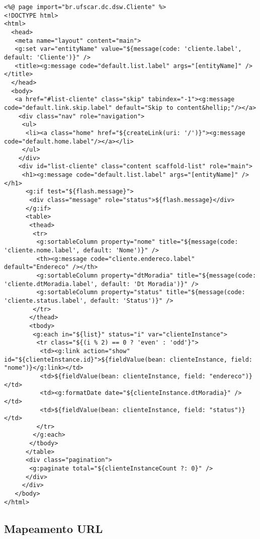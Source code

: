 \begin{lstlisting}[caption=Visão       {\bf       cliente/index.gsp},      frame
    =trBL,float=htbp, label=codCliIndex] 
<%@ page import="br.ufscar.dc.dsw.Cliente" %>
<!DOCTYPE html>
<html>
  <head>
   <meta name="layout" content="main">
   <g:set var="entityName" value="${message(code: 'cliente.label', default: 'Cliente')}" />
   <title><g:message code="default.list.label" args="[entityName]" /></title>
  </head>
  <body>
   <a href="#list-cliente" class="skip" tabindex="-1"><g:message code="default.link.skip.label" default="Skip to content&hellip;"/></a>
    <div class="nav" role="navigation">
     <ul>
      <li><a class="home" href="${createLink(uri: '/')}"><g:message code="default.home.label"/></a></li>
     </ul>
    </div>
    <div id="list-cliente" class="content scaffold-list" role="main">
     <h1><g:message code="default.list.label" args="[entityName]" /></h1>
      <g:if test="${flash.message}">
       <div class="message" role="status">${flash.message}</div>
      </g:if>
      <table>
       <thead>
        <tr>
         <g:sortableColumn property="nome" title="${message(code: 'cliente.nome.label', default: 'Nome')}" />
         <th><g:message code="cliente.endereco.label" default="Endereco" /></th>
         <g:sortableColumn property="dtMoradia" title="${message(code: 'cliente.dtMoradia.label', default: 'Dt Moradia')}" />
         <g:sortableColumn property="status" title="${message(code: 'cliente.status.label', default: 'Status')}" />
        </tr>
       </thead>
       <tbody>
        <g:each in="${list}" status="i" var="clienteInstance">
         <tr class="${(i % 2) == 0 ? 'even' : 'odd'}">
          <td><g:link action="show" id="${clienteInstance.id}">${fieldValue(bean: clienteInstance, field: "nome")}</g:link></td>
          <td>${fieldValue(bean: clienteInstance, field: "endereco")}</td>
          <td><g:formatDate date="${clienteInstance.dtMoradia}" /></td>
          <td>${fieldValue(bean: clienteInstance, field: "status")}</td>
         </tr>
        </g:each>
       </tbody>
      </table>
      <div class="pagination">
       <g:paginate total="${clienteInstanceCount ?: 0}" />
      </div>
     </div>
   </body>
</html>
\end{lstlisting}

\subsection{Mapeamento URL}

\vspace{0.3cm}

